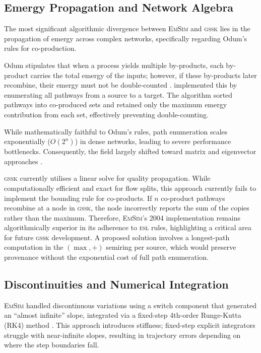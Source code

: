 \documentclass[3p,times,authoryear]{elsarticle}
\newcommand{\gssk}{\textsc{gssk}}
\newcommand{\esl}{\textsc{esl}}
\newcommand{\emsim}{\textsc{EmSim}}
\begin{document}
\subsection{Emergy Propagation and Network Algebra}
The most significant algorithmic divergence between \emsim{} and \gssk{} lies in the propagation of emergy across complex networks, specifically regarding Odum's rules for co-production. 

Odum stipulates that when a process yields multiple by-products, each by-product carries the total emergy of the inputs; however, if these by-products later recombine, their emergy must not be double-counted \citep{odum1996, brown1996}. \citet{valyi2004} implemented this by enumerating all pathways from a source to a target. The algorithm sorted pathways into co-produced sets and retained only the maximum emergy contribution from each set, effectively preventing double-counting. 

While mathematically faithful to Odum's rules, path enumeration scales exponentially ($O(2^n)$) in dense networks, leading to severe performance bottlenecks. Consequently, the field largely shifted toward matrix and eigenvector approaches \citep{collins2000}. 

\gssk{} currently utilises a linear solve for quality propagation. While computationally efficient and exact for flow splits, this approach currently fails to implement the bounding rule for co-products. If $n$ co-product pathways recombine at a node in \gssk, the node incorrectly reports the sum of the copies rather than the maximum. Therefore, \emsim's 2004 implementation remains algorithmically superior in its adherence to \esl{} rules, highlighting a critical area for future \gssk{} development. A proposed solution involves a longest-path computation in the $(\max,+)$ semiring per source, which would preserve provenance without the exponential cost of full path enumeration.

\subsection{Discontinuities and Numerical Integration}
\emsim{} handled discontinuous variations using a switch component that generated an ``almost infinite'' slope, integrated via a fixed-step 4th-order Runge-Kutta (RK4) method \citep{valyi2004}. This approach introduces stiffness; fixed-step explicit integrators struggle with near-infinite slopes, resulting in trajectory errors depending on where the step boundaries fall.
\end{document}
